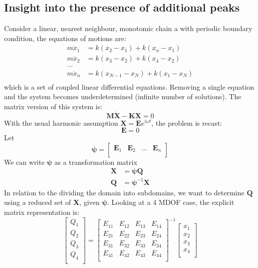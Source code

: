 \subsection*{Insight into the presence of additional peaks}
Consider a linear, nearest neighbour, monotomic chain a with periodic boundary condition, the equations of motions are:
\begin{equation}
\begin{split}
m\ddot{x}_1&=k(x_2-x_1)+k(x_n-x_1)\\
m\ddot{x}_2&=k(x_3-x_2)+k(x_4-x_2)\\
...\\
m\ddot{x}_n&=k(x_{N-1}-x_N)+k(x_1-x_N)\\
\end{split}
\end{equation}
which is a set of coupled linear differential equations. Removing a single equation and the system becomes underdetermined (infinite number of solutions). The matrix version of this system is:
\begin{equation}
\bm{M}\bm{\ddot{X}}-\bm{K}\bm{X}=0
\end{equation}
With the usual harmonic assumption $\bm{X}=\bm{E}e^{i\omega t}$, the problem is recast:
\begin{equation}
[\omega^2\bm{M}^{-1}\bm{M}-\bm{M}^{-1}\bm{K}]\bm{E}=0
\end{equation}
Let
\[
\bm{\psi}=
\begin{bmatrix}
   \bm{E}_1 & \bm{E}_2 & \dots &\bm{E}_n \\
 \end{bmatrix}
\]
We can write $\bm{\psi}$ as a transformation matrix
\begin{equation}
\begin{split}
\bm{X}&=\bm{\psi}\bm{Q}\\
\bm{Q}&=\bm{\psi}^{-1}\bm{X}
\end{split}
\end{equation}
In relation to the dividing the domain into subdomains, we want to determine $\bm{Q}$ using a reduced set of $\bm{X}$, given $\bm{\psi}$. Looking at a 4 MDOF case, the explicit matrix representation is:
\[
\begin{bmatrix}
   Q_1\\
   Q_2\\
   Q_3\\
   Q_4\\
\end{bmatrix}=
\begin{bmatrix}
   E_{11} & E_{12} & E_{13} & E_{14} \\
   E_{21} & E_{22} & E_{23} & E_{24} \\
   E_{31} & E_{32} & E_{33} & E_{34} \\
   E_{41} & E_{42} & E_{43} & E_{44} \\
\end{bmatrix}^{-1}
\begin{bmatrix}
   x_1\\
   x_2\\
   x_3\\
   x_4\\
\end{bmatrix}
\]
